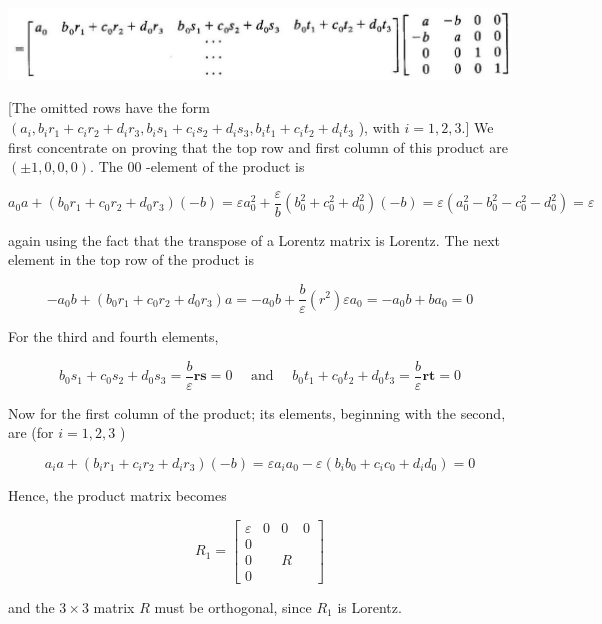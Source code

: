 \documentclass[10pt]{article}
\begin{document}
\begin{center}
\includegraphics[max width=\textwidth]{2024_04_03_41f90be4f896e21f0dc9g-187}
\end{center}

[The omitted rows have the form $\left(a_{i}, b_{i} r_{1}+c_{i} r_{2}+d_{i} r_{3}, b_{i} s_{1}+c_{i} s_{2}+d_{i} s_{3}, b_{i} t_{1}+c_{i} t_{2}+d_{i} t_{3}\right.$ ), with $i=1,2,3$.] We first concentrate on proving that the top row and first column of this product are $( \pm 1,0,0,0)$. The 00 -element of the product is

$$
a_{0} a+\left(b_{0} r_{1}+c_{0} r_{2}+d_{0} r_{3}\right)(-b)=\varepsilon a_{0}^{2}+\frac{\varepsilon}{b}\left(b_{0}^{2}+c_{0}^{2}+d_{0}^{2}\right)(-b)=\varepsilon\left(a_{0}^{2}-b_{0}^{2}-c_{0}^{2}-d_{0}^{2}\right)=\varepsilon
$$

again using the fact that the transpose of a Lorentz matrix is Lorentz. The next element in the top row of the product is

$$
-a_{0} b+\left(b_{0} r_{1}+c_{0} r_{2}+d_{0} r_{3}\right) a=-a_{0} b+\frac{b}{\varepsilon}\left(r^{2}\right) \varepsilon a_{0}=-a_{0} b+b a_{0}=0
$$

For the third and fourth elements,

$$
b_{0} s_{1}+c_{0} s_{2}+d_{0} s_{3}=\frac{b}{\varepsilon} \mathbf{r s}=0 \quad \text { and } \quad b_{0} t_{1}+c_{0} t_{2}+d_{0} t_{3}=\frac{b}{\varepsilon} \mathbf{r t}=0
$$

Now for the first column of the product; its elements, beginning with the second, are (for $i=1,2,3$ )

$$
a_{i} a+\left(b_{i} r_{1}+c_{i} r_{2}+d_{i} r_{3}\right)(-b)=\varepsilon a_{i} a_{0}-\varepsilon\left(b_{i} b_{0}+c_{i} c_{0}+d_{i} d_{0}\right)=0
$$

Hence, the product matrix becomes

$$
R_{1}=\left[\begin{array}{llll}
\varepsilon & 0 & 0 & 0 \\
0 & & & \\
0 & & R & \\
0 & & &
\end{array}\right]
$$

and the $3 \times 3$ matrix $R$ must be orthogonal, since $R_{1}$ is Lorentz.
\end{document}
